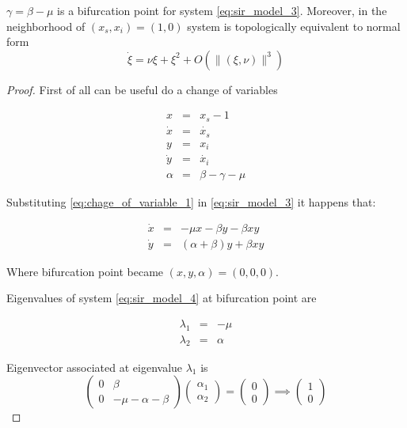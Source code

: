 \begin{theorem}
$\gamma = \beta-\mu$ is a bifurcation point for system \ref{eq:sir_model_3}. Moreover, in the neighborhood of $(x_s,x_i) = (1,0)$ system is topologically equivalent to normal form
\begin{equation}
    \dot{\xi} = \nu\xi + \xi^2 + O\left(\|(\xi,\nu)\|^3\right)
\end{equation}
\end{theorem}

\begin{proof}

First of all can be useful do a change of variables

\begin{equation}
    \label{eq:chage_of_variable_1}
    \begin{array}{ccc}
    x &=& x_s - 1 \\
    \dot{x} &=& \dot{x_s} \\
    y &=& x_i \\
    \dot{y} &=& \dot{x_i} \\
    \alpha &=& \beta - \gamma - \mu
    \end{array}
\end{equation}

Substituting \ref{eq:chage_of_variable_1} in \ref{eq:sir_model_3} it happens that:

\begin{equation}
    \label{eq:sir_model_4}
    \begin{array}{ccc}
        \dot{x} &=& -\mu x -\beta y - \beta xy \\
        \dot{y} &=& (\alpha+\beta) y +\beta xy
    \end{array}
\end{equation}

Where bifurcation point became $(x,y,\alpha) = (0,0,0)$.

Eigenvalues of system \ref{eq:sir_model_4} at bifurcation point are

\begin{equation}
    \begin{array}{ccc}
        \lambda_1 &=& -\mu \\
        \lambda_2 &=& \alpha
    \end{array}
\end{equation}

Eigenvector associated at eigenvalue $\lambda_1$ is
\begin{equation}
    \begin{pmatrix}
        0 & \beta \\ 0 & -\mu-\alpha-\beta
    \end{pmatrix}
    \begin{pmatrix}
        \alpha_1 \\ \alpha_2
    \end{pmatrix} =
    \begin{pmatrix}
        0 \\ 0
    \end{pmatrix}
    \implies
    \begin{pmatrix}
        1 \\ 0
    \end{pmatrix}
\end{equation}


\end{proof}
